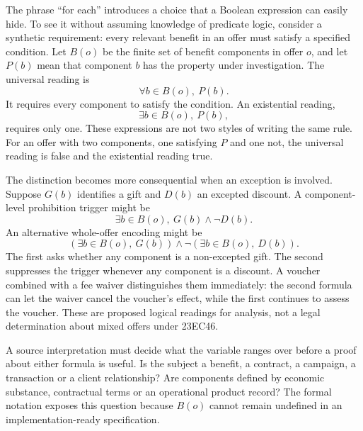 The phrase ``for each'' introduces a choice that a Boolean expression can easily
hide. To see it without assuming knowledge of predicate logic, consider a
synthetic requirement: every relevant benefit in an offer must satisfy a specified
condition. Let $B(o)$ be the finite set of benefit components in offer $o$, and
let $P(b)$ mean that component $b$ has the property under investigation. The
universal reading is
\begin{equation}
 \forall b\in B(o),\ P(b).
 \label{eq:universal-benefit}
\end{equation}
It requires every component to satisfy the condition. An existential reading,
\begin{equation}
 \exists b\in B(o),\ P(b),
 \label{eq:existential-benefit}
\end{equation}
requires only one. These expressions are not two styles of writing the same rule.
For an offer with two components, one satisfying $P$ and one not, the universal
reading is false and the existential reading true.

The distinction becomes more consequential when an exception is involved. Suppose
$G(b)$ identifies a gift and $D(b)$ an excepted discount. A component-level
prohibition trigger might be
\begin{equation}
 \exists b\in B(o),\ G(b)\land\neg D(b).
 \label{eq:component-exception}
\end{equation}
An alternative whole-offer encoding might be
\begin{equation}
 \left(\exists b\in B(o),\ G(b)\right)
 \land\neg\left(\exists b\in B(o),\ D(b)\right).
 \label{eq:offer-exception}
\end{equation}
The first asks whether any component is a non-excepted gift. The second suppresses
the trigger whenever any component is a discount. A voucher combined with a fee
waiver distinguishes them immediately: the second formula can let the waiver
cancel the voucher's effect, while the first continues to assess the voucher.
These are proposed logical readings for analysis, not a legal determination about
mixed offers under 23EC46.


A source interpretation must decide what the variable ranges over before a proof
about either formula is useful. Is the subject a benefit, a contract, a campaign,
a transaction or a client relationship? Are components defined by economic
substance, contractual terms or an operational product record? The formal
notation exposes this question because $B(o)$ cannot remain undefined in an
implementation-ready specification.

